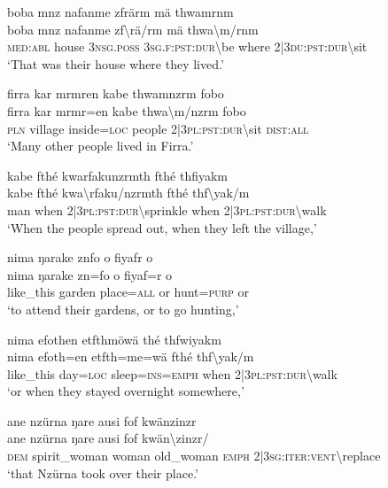 \ea\label{ex:7:a4682}
boba mnz nafanme zfrärm mä thwamrnm\\
\gll boba	mnz	nafanme	zf{\textbackslash}rä/rm	mä	thwa{\textbackslash}m/rnm\\
     \textsc{med}:\textsc{abl}	house	3\textsc{nsg}.\textsc{poss}	3\textsc{sg}.\textsc{f}:\textsc{pst}:\textsc{dur}{\textbackslash}be	where	2|3\textsc{du}:\textsc{pst}:\textsc{dur}{\textbackslash}sit\\
\glt `That was their house where they lived.'
\z

\ea\label{ex:7:a4683}
firra kar mrmren kabe thwamnzrm fobo\\
\gll firra	kar	mrmr=en	kabe	thwa{\textbackslash}m/nzrm	fobo\\
     \textsc{pln}	village	inside=\textsc{loc}	people	2|3\textsc{pl}:\textsc{pst}:\textsc{dur}{\textbackslash}sit	\textsc{dist}:\textsc{all}\\
\glt `Many other people lived in Firra.'
\z

\ea\label{ex:7:a4684}
kabe fthé kwarfakunzrmth fthé thfiyakm\\
\gll kabe	fthé	kwa{\textbackslash}rfaku/nzrmth	fthé	thf{\textbackslash}yak/m\\
     man	when	2|3\textsc{pl}:\textsc{pst}:\textsc{dur}{\textbackslash}sprinkle	when	2|3\textsc{pl}:\textsc{pst}:\textsc{dur}{\textbackslash}walk\\
\glt `When the people spread out, when they left the village,'
\z

\ea\label{ex:7:a4685}
nima ŋarake znfo o fiyafr o\\
\gll nima	ŋarake	zn=fo	o	fiyaf=r	o\\
     like\_this	garden	place=\textsc{all}	or	hunt=\textsc{purp}	or\\
\glt `to attend their gardens, or to go hunting,'
\z

\ea\label{ex:7:a4686}
nima efothen etfthmöwä thé thfwiyakm\\
\gll nima	efoth=en	etfth=me=wä	fthé	thf{\textbackslash}yak/m\\
     like\_this	day=\textsc{loc}	sleep=\textsc{ins}=\textsc{emph}	when	2|3\textsc{pl}:\textsc{pst}:\textsc{dur}{\textbackslash}walk\\
\glt `or when they stayed overnight somewhere,'
\z

\ea\label{ex:7:a4688}
ane nzürna ŋare ausi fof kwänzinzr\\
\gll ane	nzürna	ŋare	ausi	fof	kwän{\textbackslash}zinzr/\\
     \textsc{dem}	spirit\_woman	woman	old\_woman	\textsc{emph}	2|3\textsc{sg}:\textsc{iter}:\textsc{vent}{\textbackslash}replace\\
\glt `that Nzürna took over their place.'
\z

